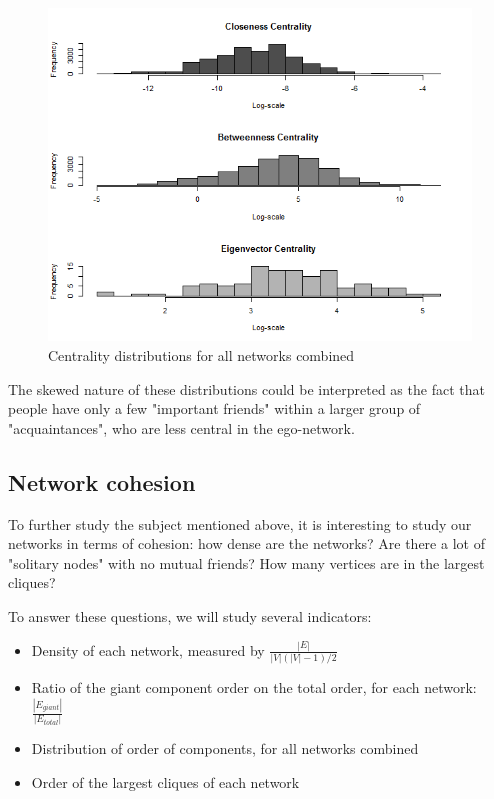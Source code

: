 \documentclass[11pt]{article}       %
\begin{document}
\begin{figure}[H]
\centering
  \includegraphics[width=0.8\linewidth]{centrality.png}
    \caption{Centrality distributions for all networks combined}
\end{figure}

The skewed nature of these distributions could be interpreted as the fact that people have only a few "important friends" within a larger group of "acquaintances", who are less central in the ego-network.

\subsection{Network cohesion} \label{networkcohesion}
To further study the subject mentioned above, it is interesting to study our networks in terms of cohesion: how dense are the networks? Are there a lot of "solitary nodes" with no mutual friends? How many vertices are in the largest cliques?

To answer these questions, we will study several indicators:
\begin{itemize}
  \item Density of each network, measured by $\frac{|E|}{|V|(|V|-1)/2}$
  \item Ratio of the giant component order on the total order, for each network: $\frac{|E_{giant}|}{|E_{total}|}$
  \item Distribution of order of components, for all networks combined
  \item Order of the largest cliques of each network
\end{itemize}
\end{document}
